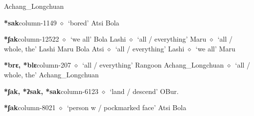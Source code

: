          Achang\_Longchuan 
  \item {\footnotesize \textbf{*sak}}{\tiny column-1149}
         $\diamond$~`bored'
         Atsi 
\hspace{1ex}
         Bola 
  \item {\footnotesize \textbf{*ʃak}}{\tiny column-12522}
         $\diamond$~`we all'
         Bola 
\hspace{1ex}
         Lashi 
\hspace{1ex}
         $\diamond$~`all / everything'
         Maru 
\hspace{1ex}
         $\diamond$~`all / whole, the'
         Lashi 
\hspace{1ex}
         Maru 
\hspace{1ex}
         Bola 
\hspace{1ex}
         Atsi 
\hspace{1ex}
         $\diamond$~`all / everything'
         Lashi 
\hspace{1ex}
         $\diamond$~`we all'
         Maru 
  \item {\footnotesize \textbf{*brɛ, *blɛ}}{\tiny column-207}
         $\diamond$~`all / everything'
         Rangoon 
\hspace{1ex}
         Achang\_Longchuan 
\hspace{1ex}
         $\diamond$~`all / whole, the'
         Achang\_Longchuan 
  \item {\footnotesize \textbf{*ʃak, *ʔsak, *sak}}{\tiny column-6123}
         $\diamond$~`land / descend'
         OBur. 
  \item {\footnotesize \textbf{*ʃak}}{\tiny column-8021}
         $\diamond$~`person w / pockmarked face'
         Atsi 
\hspace{1ex}
         Bola 
\hspace{1ex}
